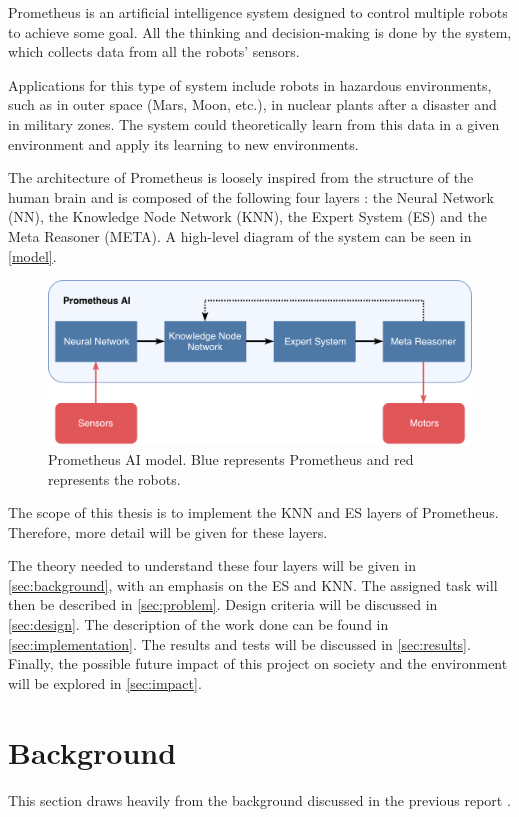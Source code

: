 \documentclass[titlepage,11pt]{article}
\begin{document}
Prometheus is an artificial intelligence system designed to control multiple robots to achieve some goal. All the thinking and decision-making is done by the system, which collects data from all the robots' sensors.

Applications for this type of system include robots in hazardous environments, such as in outer space (Mars, Moon, etc.), in nuclear plants after a disaster and in military zones.  The system could theoretically learn from this data in a given environment and apply its learning to new environments.

The architecture of Prometheus is loosely inspired from the structure of the human brain and is composed of the following four layers \cite{vybihal-model}: the Neural Network (NN), the Knowledge Node Network (KNN), the Expert System (ES) and the Meta Reasoner (META). A high-level diagram of the system can be seen in \autoref{model}.

\begin{figure}[!htb]
	\includegraphics[width=\textwidth]{figures/ai_model.pdf}
	\caption[Prometheus AI model.]{Prometheus AI model. Blue represents Prometheus and red represents the robots.}
	\label{model}
\end{figure}

The scope of this thesis is to implement the KNN and ES layers of Prometheus. Therefore, more detail will be given for these layers.

The theory needed to understand these four layers will be given in \autoref{sec:background}, with an emphasis on the ES and KNN. The assigned task will then be described in \autoref{sec:problem}. Design criteria will be discussed in \autoref{sec:design}. The description of the work done can be found in \autoref{sec:implementation}. The results and tests will be discussed in \autoref{sec:results}. Finally, the possible future impact of this project on society and the environment will be explored in \autoref{sec:impact}.

\section{Background} \label{sec:background}
This section draws heavily from the background discussed in the previous report \cite{stappas}.
\end{document}
